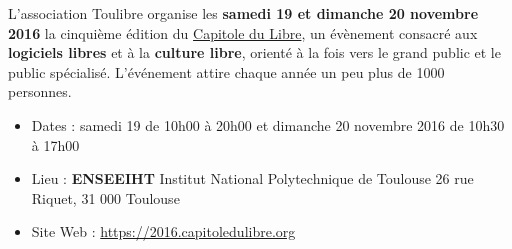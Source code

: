 

\begin{doublespace}
\begin{large}
  L'association Toulibre organise les \textbf{samedi 19 et dimanche 20 novembre 2016} la cinquième
  édition du \href{http://capitoledulibre.org}{Capitole du Libre},
  un évènement consacré aux \textbf{logiciels libres} et à la \textbf{culture libre},
  orienté à la fois vers le grand public et le public spécialisé. L'événement attire chaque année
  un peu plus de 1000 personnes.
\end{large}
\end{doublespace}
\begin{itemize}[label=$\bullet$]
\item Dates : samedi 19 de 10h00 à 20h00 et dimanche 20 novembre 2016 de 10h30 à 17h00
\item Lieu : \textbf{ENSEEIHT} Institut National Polytechnique de Toulouse
26 rue Riquet, 31 000 Toulouse
\item Site Web : \url{https://2016.capitoledulibre.org}
\end{itemize}
